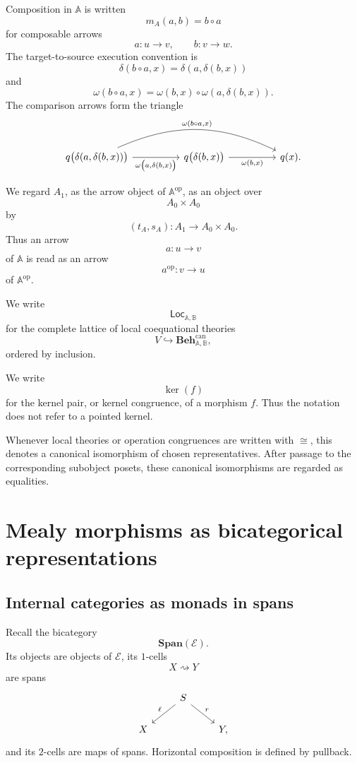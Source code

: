 Composition in \(\mathbb A\) is written
\[
    m_A(a,b)=b\circ a
\]
for composable arrows
\[
    a:u\to v,
    \qquad
    b:v\to w.
\]
The target-to-source execution convention is
\[
    \delta(b\circ a,x)
    =
    \delta(a,\delta(b,x))
\]
and
\[
    \omega(b\circ a,x)
    =
    \omega(b,x)\circ
    \omega(a,\delta(b,x)).
\]
The comparison arrows form the triangle
\[
\begin{tikzcd}[column sep=huge]
    q\bigl(\delta(a,\delta(b,x))\bigr)
        \arrow[
            r,
            "{\omega\bigl(a,\delta(b,x)\bigr)}"'
        ]
        \arrow[
            rr,
            bend left=25,
            "{\omega(b\circ a,x)}"
        ]
    &
    q\bigl(\delta(b,x)\bigr)
        \arrow[
            r,
            "{\omega(b,x)}"'
        ]
    &
    q(x).
\end{tikzcd}
\]

We regard \(A_1\), as the arrow object of \(\mathbb A^{\mathrm{op}}\), as an
object over
\[
    A_0\times A_0
\]
by
\[
    (t_A,s_A):A_1\to A_0\times A_0.
\]
Thus an arrow
\[
    a:u\to v
\]
of \(\mathbb A\) is read as an arrow
\[
    a^{\mathrm{op}}:v\to u
\]
of \(\mathbb A^{\mathrm{op}}\).

We write
\[
    \mathsf{Loc}_{\mathbb A,\mathbb B}
\]
for the complete lattice of local coequational theories
\[
    V\hookrightarrow
    \mathbf{Beh}^{\mathrm{can}}_{\mathbb A,\mathbb B},
\]
ordered by inclusion.

We write
\[
    \ker(f)
\]
for the kernel pair, or kernel congruence, of a morphism \(f\). Thus the
notation does not refer to a pointed kernel.

Whenever local theories or operation congruences are written with
\(\cong\), this denotes a canonical isomorphism of chosen representatives.
After passage to the corresponding subobject posets, these canonical
isomorphisms are regarded as equalities.

\section{Mealy morphisms as bicategorical representations}
\label{sec:to-bicategorical-representations}

\subsection{Internal categories as monads in spans}
\label{subsec:to-internal-categories-monads-spans}

Recall the bicategory
\[
    \mathbf{Span}(\mathcal E).
\]
Its objects are objects of \(\mathcal E\), its \(1\)-cells
\[
    X\rightsquigarrow Y
\]
are spans
\[
\begin{tikzcd}
    &
    S
        \arrow[dl, "\ell"']
        \arrow[dr, "r"]
    &
    \\
    X
    &&
    Y,
\end{tikzcd}
\]
and its \(2\)-cells are maps of spans. Horizontal composition is defined by
pullback.


